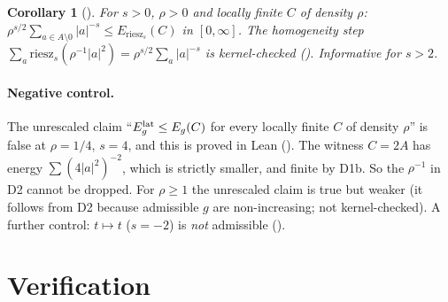 \documentclass[11pt]{article}
\newtheorem{corollary}[theorem]{Corollary}
\begin{document}
\begin{corollary}[]
For $s>0$, $\rho>0$ and locally finite $C$ of density $\rho$: $\rho^{s/2}\sum_{a\in A\setminus0}|a|^{-s}\le E_{\mathrm{riesz}_s}(C)$
in $[0,\infty]$. The homogeneity step $\sum_a \mathrm{riesz}_s(\rho^{-1}|a|^2)=\rho^{s/2}\sum_a|a|^{-s}$ is kernel-checked
(). Informative for $s>2$.
\end{corollary}

\paragraph{Negative control.} The unrescaled claim
``$E^{\rm lat}_g\le E_g(C)$ for every locally finite $C$ of density $\rho$'' is false at $\rho=1/4$, $s=4$, and this is proved in Lean (). The witness
$C=2A$ has energy $\sum(4|a|^2)^{-2}$, which is strictly smaller, and finite by D1b. So the $\rho^{-1}$ in D2 cannot be dropped. For $\rho\ge1$ the
unrescaled claim is true but weaker (it follows from D2 because admissible $g$ are non-increasing; not kernel-checked).
A further control: $t\mapsto t$ ($s=-2$) is \emph{not} admissible ().

\section{Verification}
\end{document}
